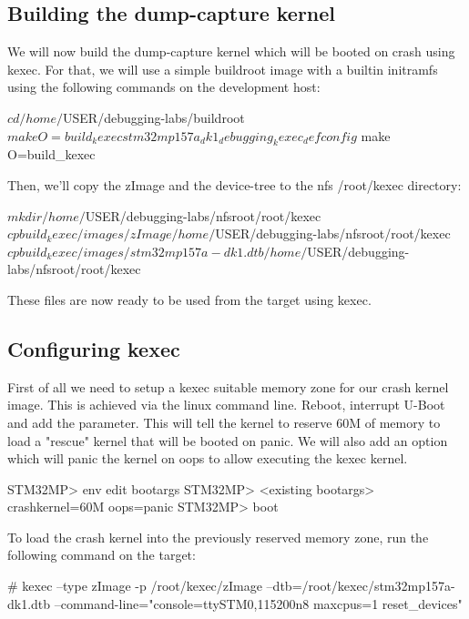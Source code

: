 \subsection{Building the dump-capture kernel}

We will now build the dump-capture kernel which will be booted on crash using
kexec. For that, we will use a simple buildroot image with a builtin initramfs
using the following commands on the development host:

\begin{bashinput}
$ cd /home/$USER/debugging-labs/buildroot
$ make O=build_kexec stm32mp157a_dk1_debugging_kexec_defconfig
$ make O=build_kexec
\end{bashinput}

Then, we'll copy the zImage and the device-tree to the nfs /root/kexec
directory:

\begin{bashinput}
$ mkdir /home/$USER/debugging-labs/nfsroot/root/kexec
$ cp build_kexec/images/zImage /home/$USER/debugging-labs/nfsroot/root/kexec
$ cp build_kexec/images/stm32mp157a-dk1.dtb /home/$USER/debugging-labs/nfsroot/root/kexec
\end{bashinput}

These files are now ready to be used from the target using kexec.

\subsection{Configuring kexec}

First of all we need to setup a kexec suitable memory zone for our crash kernel
image. This is achieved via the linux command line. Reboot, interrupt U-Boot and
add the  parameter. This will tell the kernel to reserve
60M of memory to load a "rescue" kernel that will be booted on panic. We will
also add an option which will panic the kernel on oops to allow executing the
kexec kernel.

\begin{bashinput}
STM32MP> env edit bootargs
STM32MP> <existing bootargs> crashkernel=60M oops=panic
STM32MP> boot
\end{bashinput}

To load the crash kernel into the previously reserved memory zone, run the
following command on the target:

\begin{bashinput}
# kexec --type zImage -p /root/kexec/zImage --dtb=/root/kexec/stm32mp157a-dk1.dtb
  --command-line="console=ttySTM0,115200n8 maxcpus=1 reset_devices"
\end{bashinput}

